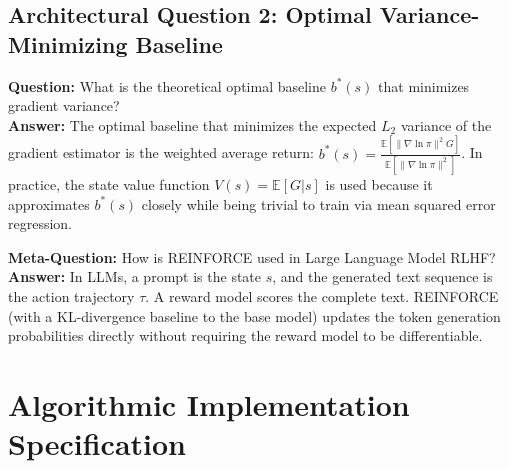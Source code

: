 \documentclass[11pt,a4paper]{article}
\theoremstyle{definition}
\begin{document}
\subsection{Architectural Question 2: Optimal Variance-Minimizing Baseline}
\textbf{Question:} What is the theoretical optimal baseline $b^*(s)$ that minimizes gradient variance?\\
\textbf{Answer:} The optimal baseline that minimizes the expected $L_2$ variance of the gradient estimator is the weighted average return: $b^*(s) = \frac{\mathbb{E}[\|\nabla \ln \pi\|^2 G]}{\mathbb{E}[\|\nabla \ln \pi\|^2]}$. In practice, the state value function $V(s) = \mathbb{E}[G | s]$ is used because it approximates $b^*(s)$ closely while being trivial to train via mean squared error regression.

\textbf{Meta-Question:} How is REINFORCE used in Large Language Model RLHF?\\
\textbf{Answer:} In LLMs, a prompt is the state $s$, and the generated text sequence is the action trajectory $\tau$. A reward model scores the complete text. REINFORCE (with a KL-divergence baseline to the base model) updates the token generation probabilities directly without requiring the reward model to be differentiable.

\section{Algorithmic Implementation Specification}
\end{document}

